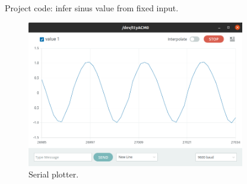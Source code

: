 \begin{frame}
    \begin{listing}[H]
        \caption{Project code: infer sinus value from fixed input.}
        \label{lst:arduino:tflite:sinewave:loop}
    \end{listing}
\end{frame}

\begin{frame}
    \begin{figure}
        \includegraphics[width=0.85\textwidth]{images/microcontroller/sinewave-serial-plotter.png}
        \caption{Serial plotter.}
    \end{figure}
\end{frame}